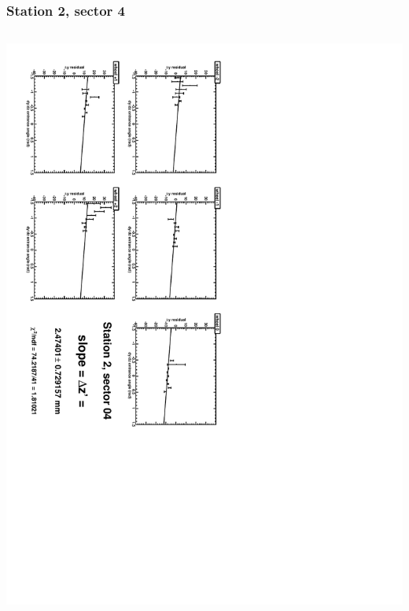 \documentclass[compress]{beamer}
\begin{document}
\begin{frame}
\frametitle{Station 2, sector 4}
\begin{columns}
\includegraphics[height=\linewidth, angle=90]{zfits/zfit_2_04.pdf}


\end{columns}
\end{frame}
\end{document}
